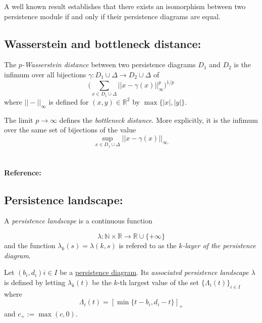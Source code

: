 \documentclass{amsart}
\begin{document}
	A well known result establishes that there exists an isomorphism between two persistence module if and only if their persistence diagrams are equal.
	
	\subsection*{Wasserstein and bottleneck distance:}	\label{wasserstein and bottleneck distance}
	
	The \textit{$p$-Wasserstein distance} between two persistence diagrams $D_1$ and $D_2$ is the infimum over all bijections $\gamma: D_1 \cup \Delta \to D_2 \cup \Delta$ of
	\begin{equation*}
	\Big(\sum_{x \in D_1 \cup \Delta} ||x - \gamma(x)||_\infty^p \Big)^{1/p}
	\end{equation*}
	where $||-||_\infty$ is defined for $(x,y) \in \mathbb R^2$ by $\max\{|x|, |y|\}$. 
	
	The limit $p \to \infty$ defines the \textit{bottleneck distance}. More explicitly, it is the infimum over the same set of bijections of the value
	\begin{equation*}
	\sup_{x \in D_1 \cup \Delta} ||x - \gamma(x)||_{\infty.}
	\end{equation*}
	
	\paragraph{\\ Reference:} \cite{kerber2017geometry}
	
	\subsection*{Persistence landscape:} \label{persistence landscape}
	
	A \textit{persistence landscape} is a continuous function
	
	\begin{equation*}
	\lambda : \mathbb N \times \mathbb R \to \mathbb R \cup \{+\infty\}
	\end{equation*}
	and the function $\lambda_k(s) = \lambda(k,s)$ is refered to as the \textit{$k$-layer of the persistence diagram}.
	
	Let ${(b_i, d_i)}{i \in I}$ be a \hyperref[persistence diagram] {persistence diagram}. Its \textit{associated persistence landscape} $\lambda$ is defined by letting $\lambda_k(t)$ be the $k$-th largest value of the set $\{\Lambda_i(t)\}_ {i \in I}$ where
	\begin{equation*}
	\Lambda_i(t) = \left[ \min \{t-b_i, d_i-t\}\right]_+
	\end{equation*}
	and $c_+ := \max(c,0)$.
	
\end{document}

